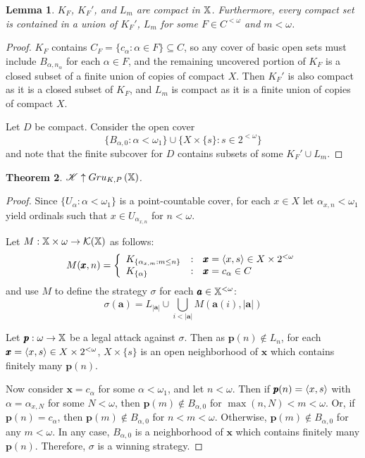 \documentclass{amsart}
\newtheorem{theorem}{Theorem}[section]
\newtheorem{lemma}[theorem]{Lemma}
\theoremstyle{definition}
\begin{document}
\begin{lemma}
  $K_F$, $K_F'$, and $L_m$ are compact in $\mathbb{X}$.
  Furthermore, every compact set is contained in a union of $K_F'$, $L_m$
  for some $F\in C^{<\omega}$ and $m<\omega$.
\end{lemma}

\begin{proof}
  $K_F$ contains $C_F=\{c_\alpha: \alpha\in F\}\subseteq C$, so any
  cover of basic open sets must include $B_{\alpha,n_\alpha}$ for each
  $\alpha\in F$, and the remaining uncovered portion of $K_F$ is a closed
  subset of a finite union of copies of compact $X$. Then $K_F'$ is also
  compact as it is a closed subset of $K_F$, and $L_m$ is compact as it
  is a finite union of copies of compact $X$.

  Let $D$ be compact. Consider the open cover
    \[
      \{
        B_{\alpha,0}
      :
        \alpha<\omega_1
      \}
      \cup
      \{
        X\times\{s\}
      :
        s\in 2^{<\omega}
      \}
    \]
  and note that the finite subcover for $D$ contains subsets of some
  $K_F' \cup L_m$.
\end{proof}

\begin{theorem}
  $\mathscr{K}\uparrow Gru_{K,P}\left({\mathbb{X}}\right)$.
\end{theorem}

\begin{proof}
  Since $\{U_\alpha:\alpha<\omega_1\}$ is a point-countable cover,
  for each $x\in X$ let $\alpha_{x,n}<\omega_1$ yield
  ordinals such that $x\in U_{\alpha_{x,n}}$ for $n<\omega$.

  Let $M:\mathbb{X}\times \omega\to \mathcal{K}(\mathbb{X})$ as follows:
    \[
      M(\pmb x,n)
        =
      \left\{
        \begin{array}{lcl}
          K_{\{\alpha_{x,m}:m\leq n\}}
        & : &
          \pmb x = \langle x,s\rangle \in X\times 2^{<\omega}
        \\
          K_{\{\alpha\}}
        & : &
          \pmb x = c_\alpha \in C
        \end{array}
      \right.
    \]
  and use $M$ to define the strategy $\sigma$ for each
  $\pmb a\in\mathbb{X}^{<\omega}$:
    \[
      \sigma(\pmb a)
        =
      L_{|\pmb a|}
        \cup
      \bigcup_{i< |\pmb a|}
      M(\pmb a(i),|\pmb a|)
    \]

  Let $\pmb p:\omega\to\mathbb{X}$ be a legal attack against $\sigma$. Then as
  $\pmb p(n)\not\in L_n$, for each $\pmb x=\langle x,s\rangle\in X\times 2^{<\omega}$,
  $X\times\{s\}$ is an open neighborhood of $\pmb x$ which contains finitely
  many $\pmb p(n)$.

  Now consider $\pmb x=c_\alpha$ for some $\alpha<\omega_1$, and let $n<\omega$.
  Then if $\pmb p(n)=\langle x,s\rangle$ with $\alpha = \alpha_{x,N}$ for some $N<\omega$,
  then $\pmb p(m)\not\in B_{\alpha,0}$ for $\max(n,N)<m<\omega$.
  Or, if $\pmb p(n)=c_\alpha$, then
  $\pmb p(m)\not\in B_{\alpha,0}$ for $n<m<\omega$.
  Otherwise, $\pmb p(m)\not\in B_{\alpha,0}$ for any $m<\omega$.
  In any case, $B_{\alpha,0}$ is a neighborhood of $\pmb x$ which
  contains finitely
  many $\pmb p(n)$. Therefore, $\sigma$ is a winning strategy.
\end{proof}
\end{document}
